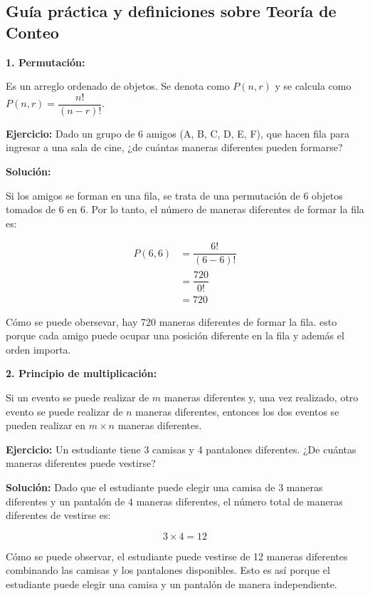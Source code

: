 \documentclass[11pt, a4paper]{article}
\begin{document}
  \subsection{Guía práctica y definiciones sobre Teoría de Conteo}
  \begin{multicols}{2}
    \begin{center}
      \textbf{1. Permutación:}
    \end{center}
    Es un arreglo ordenado de objetos. Se denota como \( P(n, r) \) y se calcula como \( P(n, r) = \dfrac{n!}{(n - r)!} \).

    \textbf{Ejercicio:} Dado un grupo de 6 amigos (A, B, C, D, E, F), que hacen fila para ingresar a una sala de cine, ¿de cuántas maneras diferentes pueden formarse?

    \textbf{Solución:} 
     
    Si los amigos se forman en una fila, se trata de una permutación de 6 objetos tomados de 6 en 6. Por lo tanto, el número de maneras diferentes de formar la fila es:

    \begin{align*}
      P(6, 6) & = \dfrac{6!}{(6 - 6)!} \\
      & = \dfrac{720}{0!} \\
      & = 720
    \end{align*}

    Cómo se puede obersevar, hay 720 maneras diferentes de formar la fila. esto porque cada amigo puede ocupar una posición diferente en la fila y además el orden importa.

    \begin{center}
      \textbf{2. Principio de multiplicación:}
    \end{center}
    Si un evento se puede realizar de \( m \) maneras diferentes y, una vez realizado, otro evento se puede realizar de \( n \) maneras diferentes, entonces los dos eventos se pueden realizar en \( m \times n \) maneras diferentes.
  
    \textbf{Ejercicio:} Un estudiante tiene 3 camisas y 4 pantalones diferentes. ¿De cuántas maneras diferentes puede vestirse?
    
    \textbf{Solución:} Dado que el estudiante puede elegir una camisa de 3 maneras diferentes y un pantalón de 4 maneras diferentes, el número total de maneras diferentes de vestirse es:

    \[ 3 \times 4 = 12 \]

    Cómo se puede observar, el estudiante puede vestirse de 12 maneras diferentes combinando las camisas y los pantalones disponibles. Esto es así porque el estudiante puede elegir una camisa y un pantalón de manera independiente.


\end{multicols}
\end{document}
